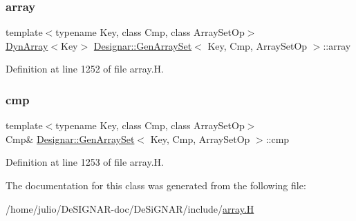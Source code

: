\subsubsection{\texorpdfstring{array}{array}}
{\footnotesize\ttfamily template$<$typename Key, class Cmp, class Array\+Set\+Op$>$ \\
\hyperlink{class_designar_1_1_dyn_array}{Dyn\+Array}$<$Key$>$ \hyperlink{class_designar_1_1_gen_array_set}{Designar\+::\+Gen\+Array\+Set}$<$ Key, Cmp, Array\+Set\+Op $>$\+::array}



Definition at line 1252 of file array.\+H.

\mbox{\label{class_designar_1_1_gen_array_set_a2b1e3c653865a794eab7d19e43c1b0de}} 
\subsubsection{\texorpdfstring{cmp}{cmp}}
{\footnotesize\ttfamily template$<$typename Key, class Cmp, class Array\+Set\+Op$>$ \\
Cmp\& \hyperlink{class_designar_1_1_gen_array_set}{Designar\+::\+Gen\+Array\+Set}$<$ Key, Cmp, Array\+Set\+Op $>$\+::cmp}



Definition at line 1253 of file array.\+H.



The documentation for this class was generated from the following file\+:\begin{DoxyCompactItemize}
\item 
/home/julio/\+De\+S\+I\+G\+N\+A\+R-\/doc/\+De\+Si\+G\+N\+A\+R/include/\hyperlink{array_8_h}{array.\+H}\end{DoxyCompactItemize}

